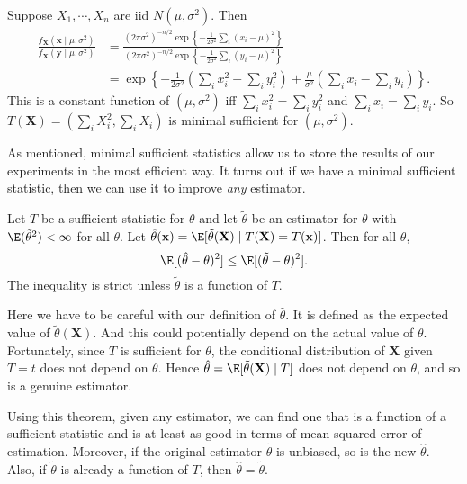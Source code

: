 \documentclass[a4paper]{article}
\begin{document}
\begin{eg}
  Suppose $X_1, \cdots, X_n$ are iid $N(\mu, \sigma^2)$. Then
  \begin{align*}
    \frac{f_\mathbf{X}(\mathbf{x}\mid \mu, \sigma^2)}{f_\mathbf{X}(\mathbf{y}\mid \mu, \sigma^2)} &= \frac{(2\pi\sigma^2)^{-n/2}\exp\left\{-\frac{1}{2\sigma^2}\sum_i(x_i - \mu)^2\right\}}{(2\pi\sigma^2)^{-n/2}\exp\left\{-\frac{1}{2\sigma^2}\sum_i(y_i - \mu)^2\right\}}\\
    &=\exp\left\{-\frac{1}{2\sigma^2}\left(\sum_i x_i^2 - \sum_i y_i^2\right) + \frac{\mu}{\sigma^2}\left(\sum_{i}x_i - \sum_i y_i\right)\right\}.
  \end{align*}
  This is a constant function of $(\mu, \sigma^2)$ iff $\sum_i x_i^2 = \sum_i y_i^2$ and $\sum_i x_i = \sum_i y_i$. So $T(\mathbf{X}) = (\sum_i X_i^2, \sum_i X_i)$ is minimal sufficient for $(\mu, \sigma^2)$.
\end{eg}

As mentioned, minimal sufficient statistics allow us to store the results of our experiments in the most efficient way. It turns out if we have a minimal sufficient statistic, then we can use it to improve \emph{any} estimator.
\begin{thm}
  Let $T$ be a sufficient statistic for $\theta$ and let $\tilde{\theta}$ be an estimator for $\theta$ with $\E(\tilde{\theta}^2) < \infty$ for all $\theta$. Let $\hat{\theta}(\mathbf{x}) = \E[\tilde{\theta}(\mathbf{X})\mid T(\mathbf{X}) = T(\mathbf{x})]$. Then for all $\theta$,
  \[
    \E[(\hat{\theta} - \theta)^2] \leq \E[(\tilde{\theta} - \theta)^2].
  \]
  The inequality is strict unless $\tilde{\theta}$ is a function of $T$.
\end{thm}
Here we have to be careful with our definition of $\hat{\theta}$. It is defined as the expected value of $\tilde{\theta}(\mathbf{X})$. And this could potentially depend on the actual value of $\theta$. Fortunately, since $T$ is sufficient for $\theta$, the conditional distribution of $\mathbf{X}$ given $T = t$ does not depend on $\theta$. Hence $\hat{\theta} = \E[\tilde{\theta}(\mathbf{X})\mid T]$ does not depend on $\theta$, and so is a genuine estimator.

Using this theorem, given any estimator, we can find one that is a function of a sufficient statistic and is at least as good in terms of mean squared error of estimation. Moreover, if the original estimator $\tilde{\theta}$ is unbiased, so is the new $\hat{\theta}$. Also, if $\tilde{\theta}$ is already a function of $T$, then $\hat{\theta} = \tilde{\theta}$.
\end{document}
